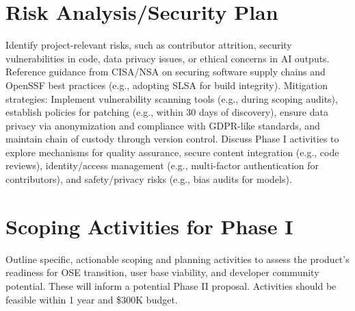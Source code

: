 \documentclass[11pt]{article}
\begin{document}
\section*{Risk Analysis/Security Plan}
\vspace{-3pt}
\noindent
Identify project-relevant risks, such as contributor attrition, security vulnerabilities in code, data privacy issues, or ethical concerns in AI outputs. Reference guidance from CISA/NSA on securing software supply chains and OpenSSF best practices (e.g., adopting SLSA for build integrity).
Mitigation strategies: Implement vulnerability scanning tools (e.g., during scoping audits), establish policies for patching (e.g., within 30 days of discovery), ensure data privacy via anonymization and compliance with GDPR-like standards, and maintain chain of custody through version control. Discuss Phase I activities to explore mechanisms for quality assurance, secure content integration (e.g., code reviews), identity/access management (e.g., multi-factor authentication for contributors), and safety/privacy risks (e.g., bias audits for models).
\vspace{-3pt}
\section*{Scoping Activities for Phase I}
\vspace{-3pt}
\noindent
Outline specific, actionable scoping and planning activities to assess the product's readiness for OSE transition, user base viability, and developer community potential. These will inform a potential Phase II proposal. Activities should be feasible within 1 year and \$300K budget.
\vspace{-3pt}
\end{document}
